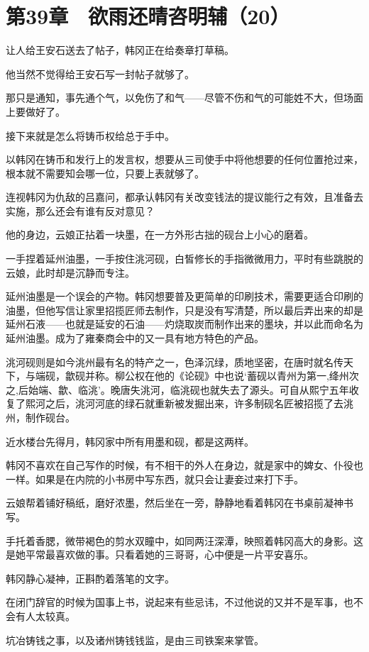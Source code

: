 \section{第39章　欲雨还晴咨明辅（20）}

让人给王安石送去了帖子，韩冈正在给奏章打草稿。

他当然不觉得给王安石写一封帖子就够了。

那只是通知，事先通个气，以免伤了和气——尽管不伤和气的可能姓不大，但场面上要做好了。

接下来就是怎么将铸币权给总于手中。

以韩冈在铸币和发行上的发言权，想要从三司使手中将他想要的任何位置抢过来，根本就不需要知会哪一位，只要上表就够了。

连视韩冈为仇敌的吕嘉问，都承认韩冈有关改变钱法的提议能行之有效，且准备去实施，那么还会有谁有反对意见？

他的身边，云娘正拈着一块墨，在一方外形古拙的砚台上小心的磨着。

一手捏着延州油墨，一手按住洮河砚，白皙修长的手指微微用力，平时有些跳脱的云娘，此时却是沉静而专注。

延州油墨是一个误会的产物。韩冈想要普及更简单的印刷技术，需要更适合印刷的油墨，但他写信让家里招揽匠师去制作，只是没有写清楚，所以最后弄出来的却是延州石液——也就是延安的石油——灼烧取炭而制作出来的墨块，并以此而命名为延州油墨。成为了雍秦商会中的又一具有地方特色的产品。

洮河砚则是如今洮州最有名的特产之一，色泽沉绿，质地坚密，在唐时就名传天下，与端砚，歙砚并称。柳公权在他的《论砚》中也说‘蓄砚以青州为第一,绛州次之,后始端、歙、临洮’。晚唐失洮河，临洮砚也就失去了源头。可自从熙宁五年收复了熙河之后，洮河河底的绿石就重新被发掘出来，许多制砚名匠被招揽了去洮州，制作砚台。

近水楼台先得月，韩冈家中所有用墨和砚，都是这两样。

韩冈不喜欢在自己写作的时候，有不相干的外人在身边，就是家中的婢女、仆役也一样。如果是在内院的小书房中写东西，就只会让妻妾过来打下手。

云娘帮着铺好稿纸，磨好浓墨，然后坐在一旁，静静地看着韩冈在书桌前凝神书写。

手托着香腮，微带褐色的剪水双瞳中，如同两汪深潭，映照着韩冈高大的身影。这是她平常最喜欢做的事。只看着她的三哥哥，心中便是一片平安喜乐。

韩冈静心凝神，正斟酌着落笔的文字。

在闭门辞官的时候为国事上书，说起来有些忌讳，不过他说的又并不是军事，也不会有人太较真。

坑冶铸钱之事，以及诸州铸钱钱监，是由三司铁案来掌管。

